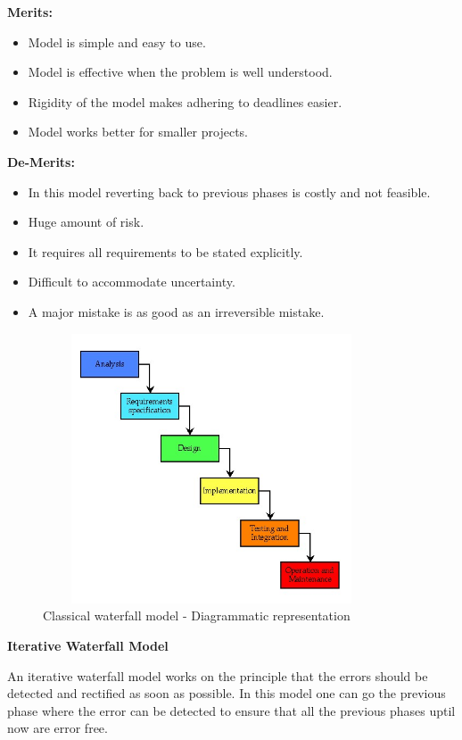 \documentclass{article}
\begin{document}
\textbf{Merits:}
\begin{itemize}
    \item Model is simple and easy to use.
    \item Model is effective when the problem is well understood.
    \item Rigidity of the model makes adhering to deadlines easier.
    \item 	Model works better for smaller projects.

\end{itemize}
\textbf{De-Merits:}

\begin{itemize}
    \item 		In this model reverting back to previous phases is costly and not feasible.
    \item 	Huge amount of risk.
    \item 	It requires all requirements to be stated explicitly.
    \item  Difficult to accommodate uncertainty.
    \item 	A major mistake is as good as an irreversible mistake.

 \end{itemize}
 \vspace{1cm}
\begin{figure}
  \includegraphics[width=10cm, height=8cm]{fig1.jpg}
  \caption{Classical waterfall model - Diagrammatic representation}
  
\end{figure}
\vspace{7cm}

\large{\textbf{Iterative Waterfall Model}}

An iterative waterfall model works on the principle that the errors should be detected and rectified as soon as possible. In this model one can go the previous phase where the error can be detected to ensure that all the previous phases uptil now are error free. \\
\end{document}
